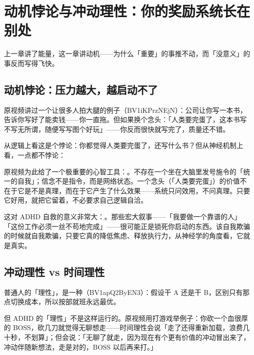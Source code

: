 \section{动机悖论与冲动理性：你的奖励系统长在别处}

上一章讲了能量，这一章讲动机——为什么「重要」的事推不动，而「没意义」的事反而写得飞快。

\subsection{动机悖论：压力越大，越启动不了}

原视频讲过一个让很多人拍大腿的例子（BV1iKPrzNEjN）：公司让你写一本书，告诉你写好了能卖钱——你一直拖。但如果换个念头：「人类要完蛋了，这本书写不写无所谓，随便写写图个好玩」——你反而很快就写完了，质量还不错。

从逻辑上看这是个悖论：你都觉得人类要完蛋了，还写什么书？但从神经机制上看，一点都不悖论：


原视频为此给了一个极重要的心智工具：。不存在一个坐在大脑里发号施令的「统一的自我」；信念不是指令，而是网络状态。一个念头（「人类要完蛋」）的价值不在于它是不是真理，而在于它产生了什么效果——系统只问效用，不问真理。只要它好用，就把它留着，不必要求自己逻辑自洽。

\begin{insight}
这对 ADHD 自救的意义非常大：。那些宏大叙事——「我要做一个靠谱的人」「这份工作必须一丝不苟地完成」——很可能正是锁死你启动的东西。该自我欺骗的时候就自我欺骗，只要它真的降低焦虑、释放执行力，从神经学的角度看，它就是真实。
\end{insight}

\subsection{冲动理性 vs 时间理性}

普通人的「理性」，是一种（BV1apQ2ByEN3）：假设干 A 还是干 B，区别只有那点切换成本，所以按部就班永远最优。

但 ADHD 的「理性」不是这样运行的。原视频用打游戏举例子：你砍一个血很厚的 BOSS，砍几刀就觉得无聊想走——时间理性会说「走了还得重新加载，浪费几十秒，不划算」；但会说：「无聊了就走，因为现在有个更有价值的冲动冒出来了，冲动伴随新想法，走是对的，BOSS 以后再来打。」

